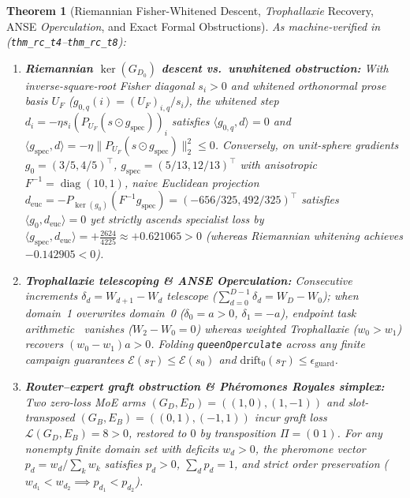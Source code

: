 \documentclass[11pt,a4paper]{article}
\newtheorem{theorem}{Theorem}[section]
\begin{document}
\begin{theorem}[Riemannian Fisher-Whitened Descent, \emph{Trophallaxie} Recovery, ANSE \emph{Operculation}, and Exact Formal Obstructions]
\label{thm:v440_rc_obstructions}
As machine-verified in  (\texttt{thm\_rc\_t4}--\texttt{thm\_rc\_t8}):
\begin{enumerate}[leftmargin=1.6em]
    \item \textbf{Riemannian $\ker(G_{D_0})$ descent vs.\ unwhitened obstruction:} With inverse-square-root Fisher diagonal $s_i > 0$ and whitened orthonormal prose basis $U_F$ ($g_{0,q}(i) = (U_F)_{i,q}/s_i$), the whitened step $d_i = -\eta s_i (P_{U_F}(s \odot g_{\mathrm{spec}}))_i$ satisfies $\langle g_{0,q}, d\rangle = 0$ and $\langle g_{\mathrm{spec}}, d\rangle = -\eta \|P_{U_F}(s \odot g_{\mathrm{spec}})\|_2^2 \le 0$. Conversely, on unit-sphere gradients $g_0 = (3/5, 4/5)^\top$, $g_{\mathrm{spec}} = (5/13, 12/13)^\top$ with anisotropic $F^{-1} = \operatorname{diag}(10, 1)$, naive Euclidean projection $d_{\mathrm{euc}} = -P_{\ker(g_0)}(F^{-1}g_{\mathrm{spec}}) = (-656/325, 492/325)^\top$ satisfies $\langle g_0, d_{\mathrm{euc}}\rangle = 0$ yet strictly \emph{ascends} specialist loss by $\langle g_{\mathrm{spec}}, d_{\mathrm{euc}}\rangle = +\frac{2624}{4225} \approx +0.621065 > 0$ (whereas Riemannian whitening achieves $-0.142905 < 0$).
    \item \textbf{\emph{Trophallaxie} telescoping \& ANSE \emph{Operculation}:} Consecutive increments $\delta_d = W_{d+1} - W_d$ telescope ($\sum_{d=0}^{D-1}\delta_d = W_D - W_0$); when domain~1 overwrites domain~0 ($\delta_0 = a > 0$, $\delta_1 = -a$), endpoint task arithmetic~\cite{ilharco2022taskarith} vanishes ($W_2 - W_0 = 0$) whereas weighted \emph{Trophallaxie} ($w_0 > w_1$) recovers $(w_0 - w_1)a > 0$. Folding \texttt{queenOperculate} across any finite campaign guarantees $\mathcal{E}(s_T) \le \mathcal{E}(s_0)$ and $\mathrm{drift}_0(s_T) \le \epsilon_{\mathrm{guard}}$.
    \item \textbf{Router--expert graft obstruction \& \emph{Ph\'eromones Royales} simplex:} Two zero-loss MoE arms $(G_D, E_D) = ((1,0),(1,-1))$ and slot-transposed $(G_B, E_B) = ((0,1),(-1,1))$ incur graft loss $\mathcal{L}(G_D, E_B) = 8 > 0$, restored to $0$ by transposition $\Pi = (0\;1)$. For any nonempty finite domain set with deficits $w_d > 0$, the pheromone vector $p_d = w_d / \sum_k w_k$ satisfies $p_d > 0$, $\sum_d p_d = 1$, and strict order preservation ($w_{d_1} < w_{d_2} \implies p_{d_1} < p_{d_2}$).
\end{enumerate}
\end{theorem}
\end{document}
